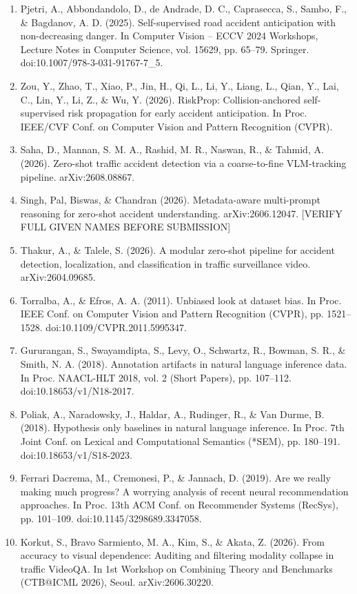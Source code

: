\begin{enumerate}
\item
  Pjetri, A., Abbondandolo, D., de Andrade, D. C., Caprasecca, S., Sambo, F., \& Bagdanov, A. D. (2025). Self-supervised road accident anticipation with non-decreasing danger. In Computer Vision -- ECCV 2024 Workshops, Lecture Notes in Computer Science, vol. 15629, pp. 65--79. Springer. doi:10.1007/978-3-031-91767-7\_5.
\item
  Zou, Y., Zhao, T., Xiao, P., Jin, H., Qi, L., Li, Y., Liang, L., Qian, Y., Lai, C., Lin, Y., Li, Z., \& Wu, Y. (2026). RiskProp: Collision-anchored self-supervised risk propagation for early accident anticipation. In Proc. IEEE/CVF Conf. on Computer Vision and Pattern Recognition (CVPR).
\item
  Saha, D., Mannan, S. M. A., Rashid, M. R., Naswan, R., \& Tahmid, A. (2026). Zero-shot traffic accident detection via a coarse-to-fine VLM-tracking pipeline. arXiv:2608.08867.
\item
  Singh, Pal, Biswas, \& Chandran (2026). Metadata-aware multi-prompt reasoning for zero-shot accident understanding. arXiv:2606.12047. {[}VERIFY FULL GIVEN NAMES BEFORE SUBMISSION{]}
\item
  Thakur, A., \& Talele, S. (2026). A modular zero-shot pipeline for accident detection, localization, and classification in traffic surveillance video. arXiv:2604.09685.
\item
  Torralba, A., \& Efros, A. A. (2011). Unbiased look at dataset bias. In Proc. IEEE Conf. on Computer Vision and Pattern Recognition (CVPR), pp. 1521--1528. doi:10.1109/CVPR.2011.5995347.
\item
  Gururangan, S., Swayamdipta, S., Levy, O., Schwartz, R., Bowman, S. R., \& Smith, N. A. (2018). Annotation artifacts in natural language inference data. In Proc. NAACL-HLT 2018, vol. 2 (Short Papers), pp. 107--112. doi:10.18653/v1/N18-2017.
\item
  Poliak, A., Naradowsky, J., Haldar, A., Rudinger, R., \& Van Durme, B. (2018). Hypothesis only baselines in natural language inference. In Proc. 7th Joint Conf. on Lexical and Computational Semantics (*SEM), pp. 180--191. doi:10.18653/v1/S18-2023.
\item
  Ferrari Dacrema, M., Cremonesi, P., \& Jannach, D. (2019). Are we really making much progress? A worrying analysis of recent neural recommendation approaches. In Proc. 13th ACM Conf. on Recommender Systems (RecSys), pp. 101--109. doi:10.1145/3298689.3347058.
\item
  Korkut, S., Bravo Sarmiento, M. A., Kim, S., \& Akata, Z. (2026). From accuracy to visual dependence: Auditing and filtering modality collapse in traffic VideoQA. In 1st Workshop on Combining Theory and Benchmarks (CTB@ICML 2026), Seoul. arXiv:2606.30220.

\end{enumerate}
